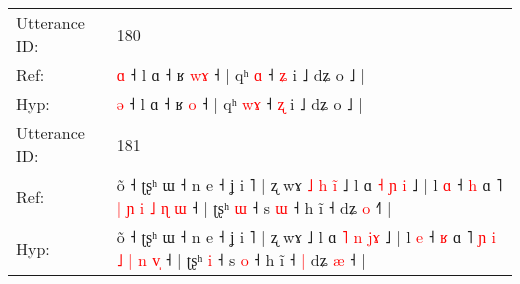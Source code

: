\documentclass[10pt]{article}
\DeclareRobustCommand{\hl}[1]{{\textcolor{red}{#1}}}
\begin{document}
\begin{longtable}{ll}
 \\
\midrule
Utterance ID: & 180 \\
Ref: & \hl{ɑ} ˧ l ɑ ˧ ʁ \hl{w}\hl{ɤ} ˧ | qʰ \hl{}\hl{ɑ} ˧ \hl{ʑ} i ˩ dʑ o ˩ |
 \\
Hyp: & \hl{ə} ˧ l ɑ ˧ ʁ \hl{}\hl{o} ˧ | qʰ \hl{w}\hl{ɤ} ˧ \hl{ʐ} i ˩ dʑ o ˩ |
 \\
\midrule
Utterance ID: & 181 \\
Ref: & õ ˧ ʈʂʰ ɯ ˧ n e ˧ ʝ i ˥ | ʐ wɤ\hl{ }\hl{˩}\hl{ }\hl{h}\hl{ }\hl{i}\hl{̃} ˩ l ɑ \hl{˧} \hl{ɲ} \hl{}\hl{i} ˩ | l \hl{ɑ} ˧ \hl{h} ɑ ˥ \hl{|} \hl{ɲ} \hl{i} \hl{˩} \hl{ɳ} \hl{}\hl{ɯ} ˧ | ʈʂʰ \hl{ɯ} ˧ s \hl{ɯ} ˧ h ĩ ˧\hl{}\hl{} dʑ \hl{o} ˧\hl{˥} |
 \\
Hyp: & õ ˧ ʈʂʰ ɯ ˧ n e ˧ ʝ i ˥ | ʐ wɤ\hl{}\hl{}\hl{}\hl{}\hl{}\hl{}\hl{} ˩ l ɑ \hl{˥} \hl{n} \hl{j}\hl{ɤ} ˩ | l \hl{e} ˧ \hl{ʁ} ɑ ˥ \hl{ɲ} \hl{i} \hl{˩} \hl{|} \hl{n} \hl{v}\hl{̩} ˧ | ʈʂʰ \hl{i} ˧ s \hl{o} ˧ h ĩ ˧\hl{ }\hl{|} dʑ \hl{æ} ˧\hl{} |
 \\
\midrule
\end{longtable}
\end{document}
